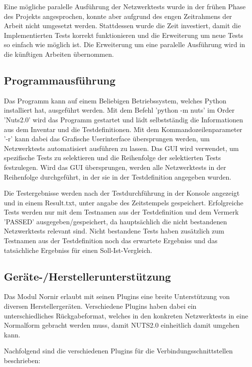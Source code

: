\documentclass[]{subfiles}
\begin{document}
Eine mögliche paralelle Ausführung der Netzwerktests wurde in der frühen Phase des Projekts
angesprochen, konnte aber aufgrund des engen Zeitrahmens der Arbeit nicht umgesetzt werden.
Stattdessen wurde die Zeit investiert, damit die Implementierten Tests korrekt funktionieren
und die Erweiterung um neue Tests so einfach wie möglich ist.
Die Erweiterung um eine paralelle Ausführung wird in die künftigen Arbeiten übernommen.

\newpage

\subsection{Programmausführung}
Das Programm kann auf einem Beliebigen Betriebssystem, welches Python installiert hat,
ausgeführt werden.
Mit dem Befehl 'python -m nuts' im Order 'Nuts2.0' wird das Programm gestartet und
lädt selbstständig die Informationen aus dem Inventar und die Testdefinitionen.
Mit dem Kommandozeilenparameter '-r' kann dabei das Grafische Userinterface übersprungen
werden, um Netzwerktests automatisiert ausführen zu lassen.
Das GUI wird verwendet, um spezifische Tests zu selektieren und die Reihenfolge der 
selektierten Tests festzulegen.
Wird das GUI übersprungen, werden alle Netzwerktests in der Reihenfolge durchgeführt,
in der sie in der Testdefinition angegeben wurden.

Die Testergebnisse werden nach der Testdurchführung in der Konsole angezeigt und 
in einem Result.txt, unter angabe des Zeitstempels gespeichert. 
Erfolgreiche Tests werden nur mit dem Testnamen aus der Testdefinition und dem Vermerk
'PASSED' ausgegeben/gespeichert, da hauptsächlich die nicht bestandenen Netzwerktests 
relevant sind.
Nicht bestandene Tests haben zusätzlich zum Testnamen aus der Testdefinition noch das
erwartete Ergebniss und das tatsächliche Ergebniss für einen Soll-Ist-Vergleich.

\newpage

\subsection{Geräte-/Herstellerunterstützung}
Das Modul Nornir erlaubt mit seinen Plugins eine breite Unterstützung von diversen 
Herstellergeräten. 
Verschiedene Plugins haben dabei ein unterschiedliches Rückgabeformat, welches 
in den konkreten Netzwerktests in eine Normalform gebracht werden muss, damit 
NUTS2.0 einheitlich damit umgehen kann.

Nachfolgend sind die verschiedenen Plugins für die Verbindungsschnittstellen beschrieben:
\end{document}
